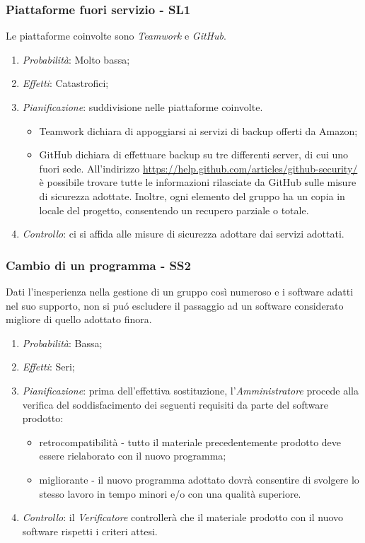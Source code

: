 \subsubsection{Piattaforme fuori servizio - SL1}
Le piattaforme coinvolte sono \textit{Teamwork} e \textit{GitHub}.
\begin{enumerate}
\item \textit{Probabilit\`a}: Molto bassa;
\item \textit{Effetti}: Catastrofici;
\item \textit{Pianificazione}: suddivisione nelle piattaforme coinvolte.
  \begin{itemize}
    \item Teamwork dichiara di appoggiarsi ai servizi di backup offerti da Amazon;
    \item GitHub dichiara di effettuare backup su tre differenti server, di cui uno fuori sede. All'indirizzo \href{https://help.github.com/articles/github-security/}{https://help.github.com/articles/github-security/} \`e possibile trovare tutte le informazioni rilasciate da GitHub sulle misure di sicurezza adottate. Inoltre, ogni elemento del gruppo ha un copia in locale del progetto, consentendo un recupero parziale o totale.
  \end{itemize}
\item \textit{Controllo}: ci si affida alle misure di sicurezza adottare dai servizi adottati.
\end{enumerate}

\subsubsection{Cambio di un programma - SS2}
Dati l'inesperienza nella gestione di un gruppo cos\`i numeroso e i software adatti nel suo supporto, non si pu\'o escludere il passaggio ad un software considerato migliore di quello adottato finora.
\begin{enumerate}
\item \textit{Probabilit\`a}: Bassa;
\item \textit{Effetti}: Seri;
\item \textit{Pianificazione}: prima dell'effettiva sostituzione, l'\textit{Amministratore} procede alla verifica del soddisfacimento dei seguenti requisiti da parte del software prodotto:
  \begin{itemize}
    \item retrocompatibilit\`a - tutto il materiale precedentemente prodotto deve essere rielaborato con il nuovo programma;
    \item migliorante - il nuovo programma adottato dovr\`a consentire di svolgere lo stesso lavoro in tempo minori e/o con una qualit\`a superiore.
  \end{itemize}
\item \textit{Controllo}: il \textit{Verificatore} controller\`a che il materiale prodotto con il nuovo software rispetti i criteri attesi.
\end{enumerate}

